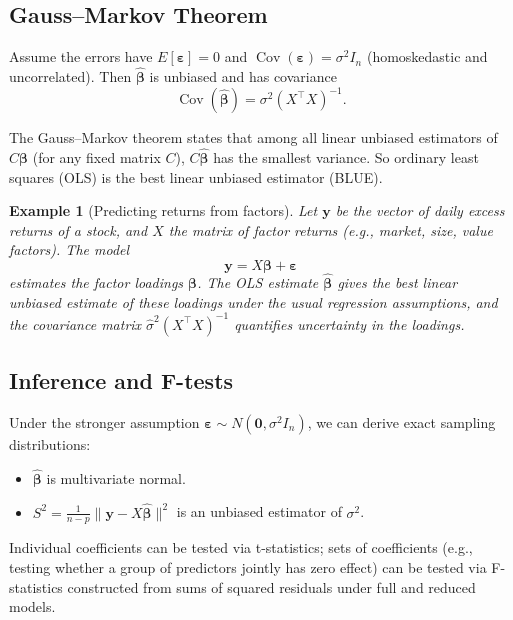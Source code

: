 \documentclass[11pt,a4paper]{article}
\newtheorem{example}{Example}[section]
\begin{document}
\subsection{Gauss–Markov Theorem}

Assume the errors have $E[\bm{\varepsilon}] = 0$ and $\operatorname{Cov}(\bm{\varepsilon}) = \sigma^2 I_n$ (homoskedastic and uncorrelated). 
Then $\hat{\bm{\beta}}$ is unbiased and has covariance
\[
\operatorname{Cov}(\hat{\bm{\beta}}) = \sigma^2 (X^\top X)^{-1}.
\]

The Gauss–Markov theorem states that among all linear unbiased estimators of $C\bm{\beta}$ (for any fixed matrix $C$), $C\hat{\bm{\beta}}$ has the smallest variance. 
So ordinary least squares (OLS) is the best linear unbiased estimator (BLUE).

\begin{example}[Predicting returns from factors]
Let $\bm{y}$ be the vector of daily excess returns of a stock, and $X$ the matrix of factor returns (e.g., market, size, value factors). 
The model
\[
\bm{y} = X\bm{\beta} + \bm{\varepsilon}
\]
estimates the factor loadings $\bm{\beta}$. 
The OLS estimate $\hat{\bm{\beta}}$ gives the best linear unbiased estimate of these loadings under the usual regression assumptions, and the covariance matrix $\hat{\sigma}^2 (X^\top X)^{-1}$ quantifies uncertainty in the loadings.

\end{example}

\subsection{Inference and F-tests}

Under the stronger assumption $\bm{\varepsilon} \sim N(\bm{0}, \sigma^2 I_n)$, we can derive exact sampling distributions:
\begin{itemize}
    \item $\hat{\bm{\beta}}$ is multivariate normal.
    \item $S^2 = \frac{1}{n-p}\|\bm{y} - X\hat{\bm{\beta}}\|^2$ is an unbiased estimator of $\sigma^2$.
\end{itemize}

Individual coefficients can be tested via t-statistics; sets of coefficients (e.g., testing whether a group of predictors jointly has zero effect) can be tested via F-statistics constructed from sums of squared residuals under full and reduced models.

\newpage
\end{document}
